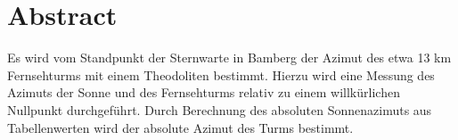 \section{Abstract}
Es wird vom Standpunkt der Sternwarte in Bamberg der Azimut des etwa 13 km Fernsehturms mit einem Theodoliten bestimmt. Hierzu wird eine Messung des Azimuts der Sonne und des Fernsehturms relativ zu einem willkürlichen Nullpunkt durchgeführt. Durch Berechnung des absoluten Sonnenazimuts aus Tabellenwerten wird der absolute Azimut des Turms bestimmt. 